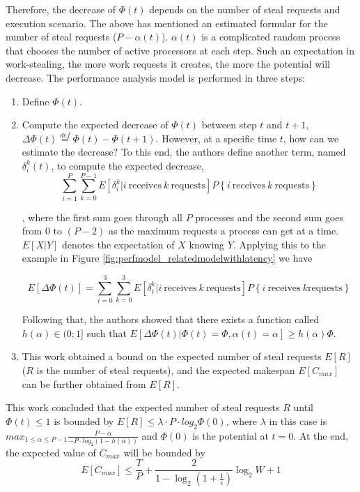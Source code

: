 Therefore, the decrease of $\Phi (t)$ depends on the number of steal requests and execution scenario. The above has mentioned an estimated formular for the number of steal requests ($P - \alpha(t)$). $\alpha(t)$ is a complicated random process that chooses the number of active processors at each step. Such an expectation in work-stealing, the more work requests it creates, the more the potential will decrease. The performance analysis model is performed in three steps:
\begin{enumerate}
	\item Define $\Phi (t)$.
	\item Compute the expected decrease of $\Phi (t)$ between step $t$ and $t+1$, $\Delta \Phi (t) \overset{def}{=} \Phi (t) - \Phi (t+1)$. However, at a specific time $t$, how can we estimate the decrease? To this end, the authors define another term, named $\delta_{i}^{k}(t)$, to compute the expected decrease,
	\begin{equation} \label{eq:expect_decrease}
		\sum_{i=1}^{P} \sum_{k=0}^{P-1} E [\delta_{i}^{k}|i\ \textrm{receives}\ k\ \textrm{requests}]P\left \{ i\ \textrm{receives}\ k\ \textrm{requests} \right \}
	\end{equation}
	
	, where the first sum goes through all $P$ processes and the second sum goes from $0$ to $(P-2)$ as the maximum requests a process can get at a time. $E[X|Y]$ denotes the expectation of $X$ knowing $Y$. Applying this to the example in Figure \ref{fig:perfmodel_relatedmodelwithlatency} we have
	
	\begin{equation}
		E[\Delta \Phi (t)] = \sum_{i=0}^{3} \sum_{k=0}^{3} E [\delta_{i}^{k}|i\ \textrm{receives}\ k\ \textrm{requests}]P\left \{ i\ \textrm{receives}\ k \textrm{requests} \right \}
	\end{equation}

	Following that, the authors showed that there exists a function called $h(\alpha) \in (0;1]$ such that $E[\Delta \Phi (t)|\Phi (t) = \Phi,\alpha(t) = \alpha] \geq h(\alpha) \Phi$.
	
	\item This work obtained a bound on the expected number of steal requests $E[R]$ ($R$ is the number of steal requests), and the expected makespan $E[C_{max}]$ can be further obtained from $E[R]$.
\end{enumerate}

This work concluded that the expected number of steal requests $R$ until $\Phi(t) \leq 1$ is bounded by $E[R] \leq \lambda \cdot P \cdot log_{2} \Phi(0)$, where $\lambda$ in this case is $max_{1 \leq \alpha \leq P-1} \frac{P-\alpha}{-P \cdot log_{2}(1-h(\alpha))}$ and $\Phi(0)$ is the potential at $t=0$. At the end, the expected value of $C_{max}$ will be bounded by 
\begin{equation}
	E[C_{max}] \leq \frac{T}{P} + \frac{2}{1-\log_{2}(1+\frac{1}{\epsilon})} \log_{2}W + 1
\end{equation}

